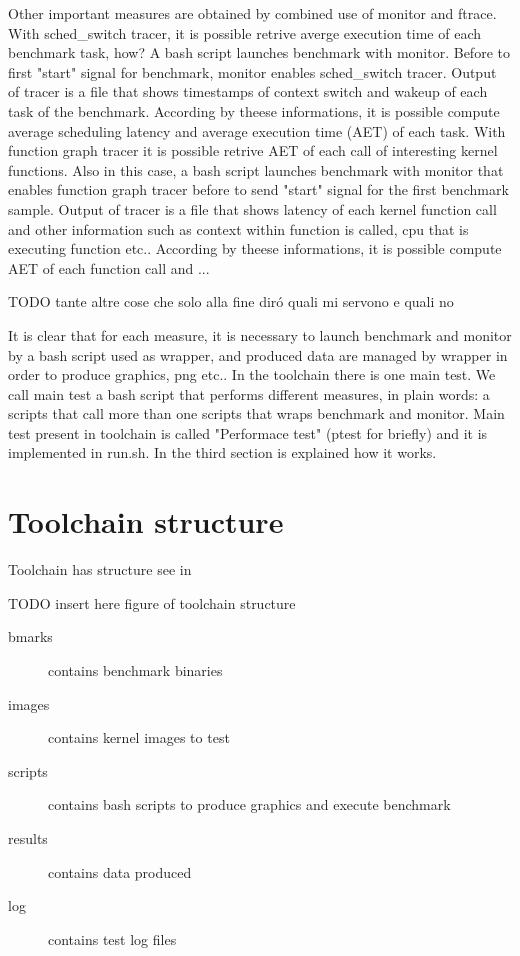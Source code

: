 \documentclass[a4paper,10pt]{article}
\begin{document}
\begin{multicols}{2}
Other important measures are obtained by combined use of monitor and ftrace.
With sched\_switch tracer, it is possible retrive averge execution time of each
benchmark task, how? A bash script launches benchmark with monitor. 
Before to first "start" signal for benchmark, monitor enables sched\_switch tracer. 
Output of  tracer is a file that shows timestamps of context switch and 
wakeup of each task of the benchmark. According by theese informations, it is possible 
compute average scheduling latency and average execution time (AET) of each task.
With function graph tracer it is possible retrive AET of each
call of interesting kernel functions. Also in this case, a bash script launches
benchmark with monitor that enables function graph tracer before to send "start" signal
for the first benchmark sample. Output of tracer is a file that shows latency of each
kernel function call and other information such as context within function is called,
cpu that is executing function etc..
According by theese informations, it is possible compute AET of each 
function call and ...

TODO tante altre cose che solo alla fine dir\'o quali mi servono e quali no

It is clear that for each measure, it is necessary to launch benchmark and monitor by 
a bash script used as wrapper, and produced data are managed by wrapper in order
to produce graphics, png etc..
In the toolchain there is one main test. We call main test a bash script that 
performs different measures, in plain words: a scripts that call more than one
scripts that wraps benchmark and monitor. Main test present in toolchain 
is called "Performace test" (ptest for briefly)
and it is implemented in run.sh. In the third section is explained how it works. 

\section{Toolchain structure}

Toolchain has structure see in 

TODO insert here figure of toolchain structure

\begin{description}
	\item[bmarks] contains benchmark binaries 
	\item[images] contains kernel images to test
	\item[scripts] contains bash scripts to produce graphics and execute benchmark
	\item[results] contains data produced
	\item[log] contains test log files
\end{description}


\end{multicols}
\end{document}
